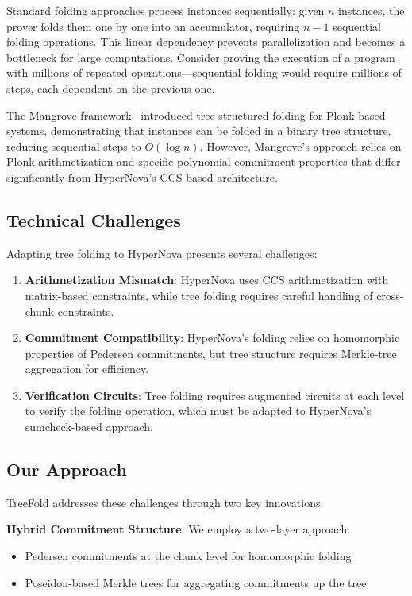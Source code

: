 \documentclass[11pt,a4paper]{article}
\theoremstyle{plain}
\theoremstyle{definition}
\begin{document}
Standard folding approaches process instances sequentially: given $n$ instances, the prover folds them one by one into an accumulator, requiring $n-1$ sequential folding operations. This linear dependency prevents parallelization and becomes a bottleneck for large computations. Consider proving the execution of a program with millions of repeated operations—sequential folding would require millions of steps, each dependent on the previous one.

The Mangrove framework~\cite{mangrove} introduced tree-structured folding for Plonk-based systems, demonstrating that instances can be folded in a binary tree structure, reducing sequential steps to $O(\log n)$. However, Mangrove's approach relies on Plonk arithmetization and specific polynomial commitment properties that differ significantly from HyperNova's CCS-based architecture.

\subsection{Technical Challenges}

Adapting tree folding to HyperNova presents several challenges:

\begin{enumerate}[itemsep=5pt]
\item \textbf{Arithmetization Mismatch}: HyperNova uses CCS arithmetization with matrix-based constraints, while tree folding requires careful handling of cross-chunk constraints.

\item \textbf{Commitment Compatibility}: HyperNova's folding relies on homomorphic properties of Pedersen commitments, but tree structure requires Merkle-tree aggregation for efficiency.

\item \textbf{Verification Circuits}: Tree folding requires augmented circuits at each level to verify the folding operation, which must be adapted to HyperNova's sumcheck-based approach.
\end{enumerate}

\subsection{Our Approach}

TreeFold addresses these challenges through two key innovations:

\textbf{Hybrid Commitment Structure}: We employ a two-layer approach:
\begin{itemize}
\item Pedersen commitments at the chunk level for homomorphic folding
\item Poseidon-based Merkle trees for aggregating commitments up the tree
\end{itemize}
\end{document}
